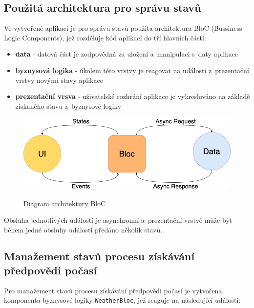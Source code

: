 \documentclass[12pt, a4paper]{article}
\begin{document}
\subsection{Použitá architektura pro správu stavů}

Ve vytvořené aplikaci je pro správu stavů použita architektura BloC (Bussiness Logic Components), jež rozděluje kód aplikací do tří hlavních částí:
\begin{itemize}
        \item \textbf{data} - datová část je zodpovědná za uložení a~manipulaci s~daty aplikace
        \item \textbf{byznysová logika} - úkolem této vrstvy je reagovat na události z~prezentační vrstvy novými stavy aplikace
        \item \textbf{prezentační vrsva} - uživatelské rozhrání aplikace je vykreslováno na základě získaného stavu z~byznysové logiky
\end{itemize}

\begin{figure}[!ht]
\centering
{\includegraphics[width=13.5cm]{img/bloc-architecture.png}}
\caption{Diagram architektury BloC}
\label{fig:vrp-recognition-diagram}
\end{figure}

Obsluha jednotlivých událostí je asynchronní a~prezentační vrstvě může být během jedné obsluhy události předáno několik stavů.


\subsection{Manažement stavů procesu získávání předpovědi počasí}

Pro manažement stavů procesu získávání předpovědi počasí je vytvořena komponenta byznysové logiky \texttt{WeatherBloc}, jež reaguje na následující události:
\end{document}
